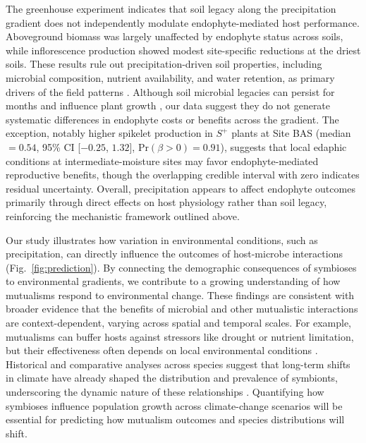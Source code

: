 \documentclass[12pt]{article}\usepackage[]{graphicx}\usepackage[dvipsnames]{xcolor}
\begin{document}
The greenhouse experiment indicates that soil legacy along the precipitation gradient does not independently modulate endophyte-mediated host performance. 
Aboveground biomass was largely unaffected by endophyte status across soils, while inflorescence production showed modest site-specific reductions at the driest soils.
These results rule out precipitation-driven soil properties, including microbial composition, nutrient availability, and water retention, as primary drivers of the field patterns \citep{van2013plant}. 
Although soil microbial legacies can persist for months and influence plant growth \citep{hannula2021persistence}, our data suggest they do not generate systematic differences in endophyte costs or benefits across the gradient. 
The exception, notably higher spikelet production in $S^{+}$ plants at Site BAS (median $= 0.54$, 95\% CI [$-0.25$, $1.32$], $\mathrm{Pr}(\beta > 0) = 0.91$), suggests that local edaphic conditions at intermediate-moisture sites may favor endophyte-mediated reproductive benefits, though the overlapping credible interval 
with zero indicates residual uncertainty.
Overall, precipitation appears to affect endophyte outcomes primarily through direct effects on host physiology rather than soil legacy, reinforcing the mechanistic framework outlined above.

Our study illustrates how variation in environmental conditions, such as precipitation, can directly influence the outcomes of host-microbe interactions (Fig.~\ref{fig:prediction}). 
By connecting the demographic consequences of symbioses to environmental gradients, we contribute to a growing understanding of how mutualisms respond to environmental change. 
These findings are consistent with broader evidence that the benefits of microbial and other mutualistic interactions are context-dependent, varying across spatial and temporal scales. 
For example, mutualisms can buffer hosts against stressors like drought or nutrient limitation, but their effectiveness often depends on local environmental conditions \citep{li2026climate}. 
Historical and comparative analyses across species suggest that long-term shifts in climate have already shaped the distribution and prevalence of symbionts, underscoring the dynamic nature of these relationships \citep{fowler2025increasing}.
Quantifying how symbioses influence population growth across climate-change scenarios will be essential for predicting how mutualism outcomes and species distributions will shift.

\end{document}
